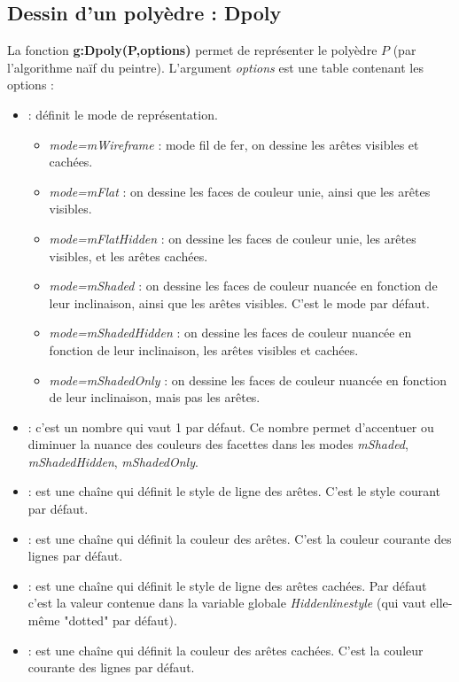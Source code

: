 \subsection{Dessin d'un polyèdre : Dpoly}

La fonction \textbf{g:Dpoly(P,options)} permet de représenter le polyèdre $P$ (par l'algorithme naïf du peintre). L'argument \emph{options} est une table contenant les options :
\begin{itemize}
    \item {} : définit le mode de représentation.
        \begin{itemize}
            \item \emph{mode=mWireframe} : mode fil de fer, on dessine les arêtes visibles et cachées.
            \item \emph{mode=mFlat} : on dessine les faces de couleur unie, ainsi que les arêtes visibles.
            \item \emph{mode=mFlatHidden} : on dessine les faces de couleur unie, les arêtes visibles, et les arêtes cachées.
            \item \emph{mode=mShaded} : on dessine les faces de couleur nuancée en fonction de leur inclinaison, ainsi que les arêtes visibles. C'est le mode par défaut.
            \item \emph{mode=mShadedHidden} : on dessine les faces de couleur nuancée en fonction de leur inclinaison, les arêtes visibles et cachées.
            \item \emph{mode=mShadedOnly} :  on dessine les faces de couleur nuancée en fonction de leur inclinaison, mais pas les arêtes.
        \end{itemize}
        \item {} : c'est un nombre qui vaut 1 par défaut. Ce nombre permet d'accentuer ou diminuer la nuance des couleurs des facettes dans les modes \emph{mShaded}, \emph{mShadedHidden}, \emph{mShadedOnly}.
        \item {} : est une chaîne qui définit le style de ligne des arêtes. C'est le style courant par défaut.
        \item {} : est une chaîne qui définit la couleur des arêtes. C'est la couleur courante des lignes par défaut.
        \item {} : est une chaîne qui définit le style de ligne des arêtes cachées. Par défaut c'est la valeur contenue dans la variable globale \emph{Hiddenlinestyle} (qui vaut elle-même "dotted" par défaut).
        \item {} : est une chaîne qui définit la couleur des arêtes cachées. C'est la couleur courante des lignes par défaut.

\end{itemize}
